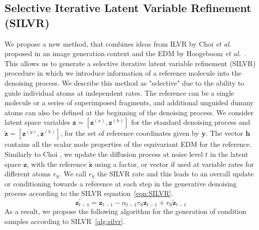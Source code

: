 \documentclass[journal=jacsat,manuscript=article]{achemso}
\begin{document}
\subsection{Selective Iterative Latent Variable Refinement (SILVR)}
\label{sec:silvr}
We propose a new method, that combines ideas from ILVR by Choi \textit{et al.}~\cite{choi2021ilvr} proposed in an image generation context and the EDM by Hoogeboom \textit{et al.}~\cite{hoogeboom2022equivariant}. This allows us to generate a selective iterative latent variable refinement (SILVR) procedure in which we introduce information of a reference molecule into the denoising process. We describe this method as "selective" due to the ability to guide individual atoms at independent rates. The reference can be a single molecule or a series of superimposed fragments, and additional unguided dummy atoms can also be defined at the beginning of the denoising process. We consider latent space variables $\mathbf{z}=[\mathbf{z}^{(x)},\mathbf{z}^{(h)}]$ for the standard denoising process and  $\mathbf{\tilde{z}} = [\mathbf{z}^{(y)},\mathbf{z}^{(h)}]$, for the set of reference coordinates given by $\mathbf{y}$. The vector $\mathbf{h}$ contains all the scalar node properties of the equivariant EDM for the reference. 
Similarly to Choi , we update the diffusion process at noise level $t$ in the latent space $\mathbf{z}$, with the reference $\mathbf{\tilde{z}}$ using a factor, or vector if used at variable rates for different atoms $r_{\mathrm{S}}$. We call $r_{\mathrm{S}}$ the SILVR rate and this leads to an overall update or conditioning towards a reference at each step in the generative denoising process according to the SILVR equation~\ref{eqn:SILVR}.
\begin{equation}
\mathbf{z}_{t-1}^{\prime} = \mathbf{z}_{t-1}-\alpha_{t-1}r_{\mathrm{S}}\mathbf{z}_{t-1}+r_{\mathrm{S}}\mathbf{\tilde{z}}_{t-1}
    \label{eqn:SILVR}
\end{equation}
As a result, we propose the following algorithm for the generation of condition samples according to SILVR~\ref{alg:silvr}.
\end{document}
